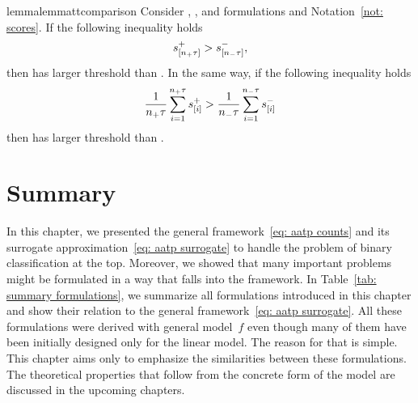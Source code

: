 \begin{restatable}{lemma}{lemmattcomparison}\label{lemma: threshold comparison 2}
  Consider \Grill, \GrillNP, \TopMeanK and \tauFPL formulations and Notation~\ref{not: scores}. If the following inequality holds
  \begin{equation*}
    s_{[n_{+}\tau]}^+ > s_{[n_{-}\tau]}^-,
  \end{equation*}
  then \Grill has larger threshold than \GrillNP. In the same way, if the following inequality holds
  \begin{equation*}
    \frac{1}{n_{+}\tau}\sum_{i=1}^{n_{+}\tau} s_{[i]}^+
      > \frac{1}{n_{-}\tau}\sum_{i=1}^{n_{-}\tau} s_{[i]}^-
  \end{equation*}
  then \TopMeanK has larger threshold than \tauFPL.
\end{restatable}

\section{Summary}

In this chapter, we presented the general framework~\eqref{eq: aatp counts} and its surrogate approximation~\eqref{eq: aatp surrogate} to handle the problem of binary classification at the top. Moreover, we showed that many important problems might be formulated in a way that falls into the framework. In Table~\ref{tab: summary formulations}, we summarize all formulations introduced in this chapter and show their relation to the general framework~\eqref{eq: aatp surrogate}. All these formulations were derived with general model~$f$ even though many of them have been initially designed only for the linear model. The reason for that is simple. This chapter aims only to emphasize the similarities between these formulations. The theoretical properties that follow from the concrete form of the model are discussed in the upcoming chapters.

